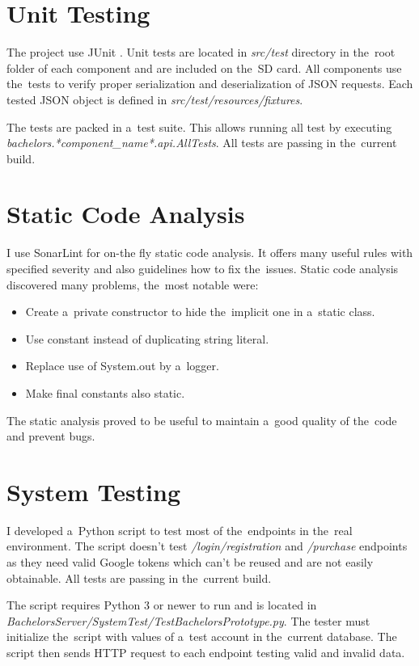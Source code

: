 \section{Unit Testing}
The project use JUnit \cite{junit}. Unit tests are located in \textit{src/test} directory in the~root folder of each component and are included on the~SD card. All components use the~tests to verify proper serialization and deserialization of JSON requests. Each tested JSON object is defined in \textit{src/test/resources/fixtures}.

The tests are packed in a~test suite. This allows running all test by executing \textit{bachelors.*component\_name*.api.AllTests}. All tests are passing in the~current build.

\section{Static Code Analysis}
I use SonarLint \cite{sonarlint} for on-the fly static code analysis. It offers many useful rules with specified severity and also guidelines how to fix the~issues. Static code analysis discovered many problems, the~most notable were:
\begin{itemize}
	\item Create a~private constructor to hide the~implicit one in a~static class.
	\item Use constant instead of duplicating string literal.
	\item Replace use of System.out by a~logger.
	\item Make final constants also static.
\end{itemize}
The static analysis proved to be useful to maintain a~good quality of the~code and prevent bugs.

\section{System Testing}
I developed a~Python script to test most of the~endpoints in the~real environment. The script doesn't test \textit{/login/registration} and \textit{/purchase} endpoints as they need valid Google tokens which can't be reused and are not easily obtainable. All tests are passing in the~current build.

The script requires Python 3 or newer to run and is located in \textit{BachelorsServer/SystemTest/TestBachelorsPrototype.py}. The tester must initialize the~script with values of a~test account in the~current database. The script then sends HTTP request to each endpoint testing valid and invalid data.

